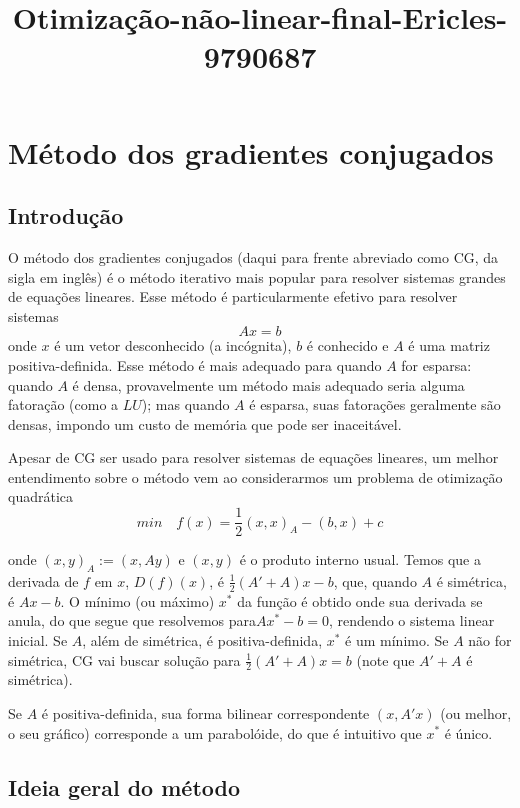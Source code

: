 \documentclass[11pt]{article}
\title{Otimização-não-linear-final-Ericles-9790687}
\begin{document}
    
    \maketitle
    
    

    
    \section{Método dos gradientes
conjugados}\label{muxe9todo-dos-gradientes-conjugados}

    \subsection{Introdução}\label{introduuxe7uxe3o}

    O método dos gradientes conjugados (daqui para frente abreviado como CG,
da sigla em inglês) é o método iterativo mais popular para resolver
sistemas grandes de equações lineares. Esse método é particularmente
efetivo para resolver sistemas \[Ax = b\] onde \(x\) é um vetor
desconhecido (a incógnita), \(b\) é conhecido e \(A\) é uma matriz
positiva-definida. Esse método é mais adequado para quando \(A\) for
esparsa: quando \(A\) é densa, provavelmente um método mais adequado
seria alguma fatoração (como a \(LU\)); mas quando \(A\) é esparsa, suas
fatorações geralmente são densas, impondo um custo de memória que pode
ser inaceitável.

    Apesar de CG ser usado para resolver sistemas de equações lineares, um
melhor entendimento sobre o método vem ao considerarmos um problema de
otimização quadrática \[
min \quad f(x) = \frac12(x,x)_A - (b,x) + c
\]

onde \((x,y)_A := (x,Ay)\) e \((x,y)\) é o produto interno usual. Temos
que a derivada de \(f\) em \(x\), \(D(f)(x)\), é
\(\frac12 (A'+ A)x - b\), que, quando \(A\) é simétrica, é \(Ax - b\). O
mínimo (ou máximo) \(x^*\) da função é obtido onde sua derivada se
anula, do que segue que resolvemos para\(Ax^* - b = 0\), rendendo o
sistema linear inicial. Se \(A\), além de simétrica, é
positiva-definida, \(x^*\) é um mínimo. Se \(A\) não for simétrica, CG
vai buscar solução para \(\frac12(A' + A)x = b\) (note que \(A' + A\) é
simétrica).

Se \(A\) é positiva-definida, sua forma bilinear correspondente
\((x,A'x)\) (ou melhor, o seu gráfico) corresponde a um parabolóide, do
que é intuitivo que \(x^*\) é único.

    \subsection{Ideia geral do método}\label{ideia-geral-do-muxe9todo}
\end{document}
